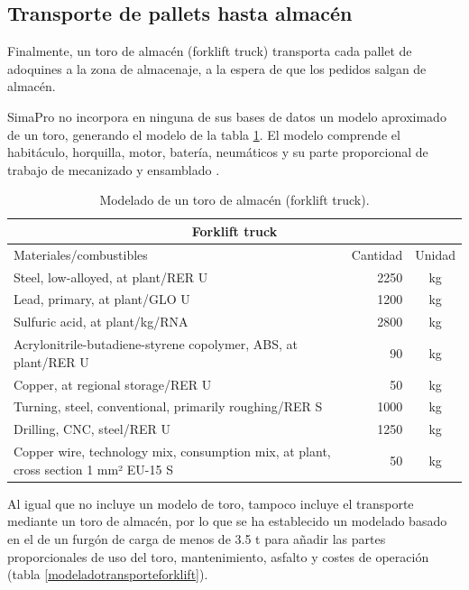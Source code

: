 \subsection{Transporte de pallets hasta almacén}
Finalmente, un toro de almacén (forklift truck) transporta cada pallet de adoquines a la zona de almacenaje, a la espera de que los pedidos salgan de almacén.

SimaPro no incorpora en ninguna de sus bases de datos un modelo aproximado de un toro, generando el modelo de la tabla \ref{modeladoforklift}. El modelo comprende el habitáculo, horquilla, motor, batería, neumáticos y su parte proporcional de trabajo de mecanizado y ensamblado \cite{ecocosts}.

\begin{table}[!htb]
\centering
\begin{tabular}{p{8cm}rc}
\toprule
\multicolumn{3}{c}{Forklift truck}\\
\midrule
Materiales/combustibles & Cantidad & Unidad\\
\midrule
Steel, low-alloyed, at plant/RER U & 2250 & \si{kg}\\
Lead, primary, at plant/GLO U & 1200 & \si{kg}\\
Sulfuric acid, at plant/kg/RNA & 2800 & \si{kg}\\
Acrylonitrile-butadiene-styrene copolymer, ABS, at plant/RER U & 90 & \si{kg}\\
Copper, at regional storage/RER U & 50 & \si{kg}\\
Turning, steel, conventional, primarily roughing/RER S & 1000 & \si{kg}\\
Drilling, CNC, steel/RER U & 1250 & \si{kg}\\
Copper wire, technology mix, consumption mix, at plant, cross section 1 mm² EU-15 S & 50 & \si{kg}\\
\bottomrule
\end{tabular}
\caption{Modelado de un toro de almacén (forklift truck).}
\label{modeladoforklift}
\end{table}

Al igual que no incluye un modelo de toro, tampoco incluye el transporte mediante un toro de almacén, por lo que se ha establecido un modelado basado en el de un furgón de carga de menos de 3.5 \si{\tonne} para añadir las partes proporcionales de uso del toro, mantenimiento, asfalto y costes de operación (tabla \ref{modeladotransporteforklift}).

